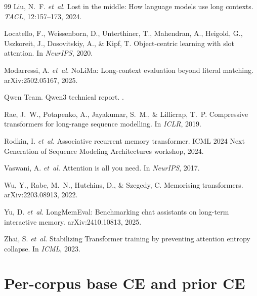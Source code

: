 \documentclass[11pt]{article}
\begin{document}
\begin{thebibliography}{99}
Liu, N.~F. \emph{et~al.}
\newblock Lost in the middle: How language models use long contexts.
\newblock \emph{TACL}, 12:157--173, 2024.

Locatello, F., Weissenborn, D., Unterthiner, T., Mahendran, A.,
  Heigold, G., Uszkoreit, J., Dosovitskiy, A., \& Kipf, T.
\newblock Object-centric learning with slot attention.
\newblock In \emph{NeurIPS}, 2020.

Modarressi, A. \emph{et~al.}
\newblock NoLiMa: Long-context evaluation beyond literal matching.
\newblock arXiv:2502.05167, 2025.

Qwen Team.
\newblock Qwen3 technical report.
.

Rae, J.~W., Potapenko, A., Jayakumar, S.~M., \& Lillicrap, T.~P.
\newblock Compressive transformers for long-range sequence modelling.
\newblock In \emph{ICLR}, 2019.

Rodkin, I. \emph{et~al.}
\newblock Associative recurrent memory transformer.
\newblock ICML 2024 Next Generation of Sequence Modeling Architectures workshop, 2024.

Vaswani, A. \emph{et~al.}
\newblock Attention is all you need.
\newblock In \emph{NeurIPS}, 2017.

Wu, Y., Rabe, M.~N., Hutchins, D., \& Szegedy, C.
\newblock Memorising transformers.
\newblock arXiv:2203.08913, 2022.

Yu, D. \emph{et~al.}
\newblock LongMemEval: Benchmarking chat assistants on long-term interactive memory.
\newblock arXiv:2410.10813, 2025.

Zhai, S. \emph{et~al.}
\newblock Stabilizing Transformer training by preventing attention entropy collapse.
\newblock In \emph{ICML}, 2023.

\end{thebibliography}

\appendix

\section{Per-corpus base CE and prior CE}
\label{app:base_ce}
\end{document}
